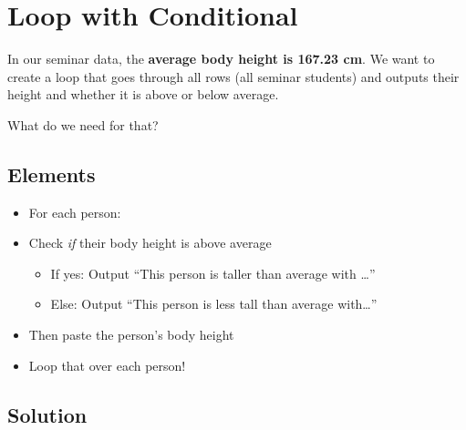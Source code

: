 \documentclass[
]{book}
\newenvironment{Shaded}{\begin{snugshade}}{\end{snugshade}}
\newcommand{\ControlFlowTok}[1]{\textcolor[rgb]{0.13,0.29,0.53}{\textbf{#1}}}
\newcommand{\DecValTok}[1]{\textcolor[rgb]{0.00,0.00,0.81}{#1}}
\newcommand{\FunctionTok}[1]{\textcolor[rgb]{0.13,0.29,0.53}{\textbf{#1}}}
\newcommand{\NormalTok}[1]{#1}
\newcommand{\SpecialCharTok}[1]{\textcolor[rgb]{0.81,0.36,0.00}{\textbf{#1}}}
\newcommand{\StringTok}[1]{\textcolor[rgb]{0.31,0.60,0.02}{#1}}
\providecommand{\tightlist}{%
  \setlength{\itemsep}{0pt}\setlength{\parskip}{0pt}}
\begin{document}
\section{Loop with Conditional}\label{loop-with-conditional}

In our seminar data, the \textbf{average body height is 167.23 cm}. We want to create a loop that goes through all rows (all seminar students) and outputs their height and whether it is above or below average.

What do we need for that?

\subsection{Elements}\label{elements}

\begin{itemize}
\tightlist
\item
  For each person:
\item
  Check \emph{if} their body height is above average

  \begin{itemize}
  \tightlist
  \item
    If yes: Output ``This person is taller than average with \ldots{}''
  \item
    Else: Output ``This person is less tall than average with\ldots{}''
  \end{itemize}
\item
  Then paste the person's body height
\item
  Loop that over each person!
\end{itemize}

\subsection{Solution}\label{solution-8}

\begin{Shaded}
\end{Shaded}
\end{document}
